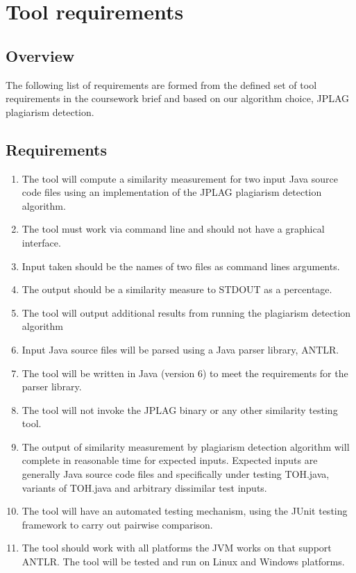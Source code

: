 \section{Tool requirements}

\subsection{Overview}
The following list of requirements are formed from the defined set of tool requirements in the coursework brief and based on our algorithm choice, JPLAG plagiarism detection.
\subsection{Requirements}
\begin{enumerate}
\item The tool will compute a similarity measurement for two input Java source code files using an implementation of the JPLAG plagiarism detection algorithm.

\item The tool must work via command line and should not have a graphical interface.

\item Input taken should be the names of two files as command lines arguments.

\item The output should be a similarity measure to STDOUT as a percentage.

\item The tool will output additional results from running the plagiarism detection algorithm

\item Input Java source files will be parsed using a Java parser library, ANTLR.

\item The tool will be written in Java (version 6) to meet the requirements for the parser library.

\item The tool will not invoke the JPLAG binary or any other similarity testing tool.

\item The output of similarity measurement by plagiarism detection algorithm will complete in reasonable time for expected inputs. Expected inputs are generally Java source code files and specifically under testing TOH.java, variants of TOH.java and arbitrary dissimilar test inputs.

\item The tool will have an automated testing mechanism, using the JUnit testing framework to carry out pairwise comparison.

\item The tool should work with all platforms the JVM works on that support ANTLR. The tool will be tested and run on Linux and Windows platforms.

\end{enumerate}
\break
